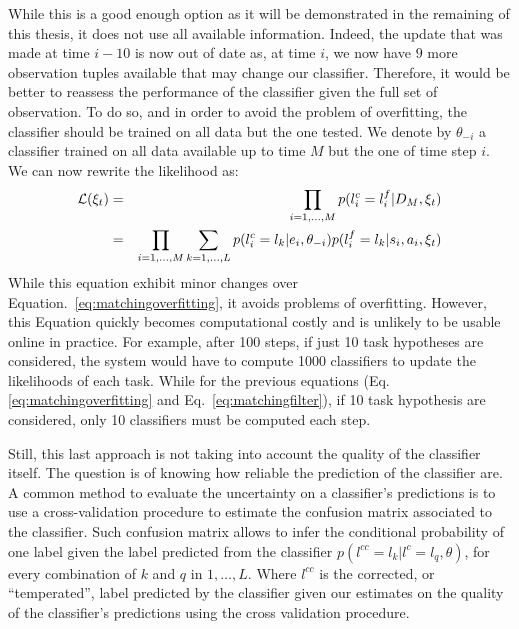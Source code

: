While this is a good enough option as it will be demonstrated in the remaining of this thesis, it does not use all available information. Indeed, the update that was made at time $i-10$ is now out of date as, at time $i$, we now have $9$ more observation tuples available that may change our classifier. Therefore, it would be better to reassess the performance of the classifier given the full set of observation. To do so, and in order to avoid the problem of overfitting, the classifier should be trained on all data but the one tested. We denote by $\theta_{-i}$ a classifier trained on all data available up to time $M$ but the one of time step $i$. We can now rewrite the likelihood as:
%
\begin{eqnarray}
\mathcal{L}(\xi_t) &=& \prod_{i = 1,\ldots,M} p(l^c_i = l^f_i | D_M, \xi_t) \nonumber \\ 
&=& \prod_{i = 1,\ldots,M} \sum_{k = 1, \ldots, L} p(l^c_i = l_k | e_i, \theta_{-i}) p(l^f_i = l_k | s_i, a_i, \xi_t) 
\label{eq:matching} 
\end{eqnarray}
%
While this equation exhibit minor changes over Equation.~\ref{eq:matchingoverfitting}, it avoids problems of overfitting. However, this Equation quickly becomes computational costly and is unlikely to be usable online in practice. For example, after 100 steps, if just 10 task hypotheses are considered, the system would have to compute 1000 classifiers to update the likelihoods of each task. While for the previous equations (Eq.\ref{eq:matchingoverfitting} and Eq.~\ref{eq:matchingfilter}), if 10 task hypothesis are considered, only 10 classifiers must be computed each step.

Still, this last approach is not taking into account the quality of the classifier itself. The question is of knowing how reliable the prediction of the classifier are. A common method to evaluate the uncertainty on a classifier's predictions is to use a cross-validation procedure to estimate the confusion matrix associated to the classifier. Such confusion matrix allows to infer the conditional probability of one label given the label predicted from the classifier $p(l^{cc} = l_k| l^c = l_q, \theta)$, for every combination of $k$ and $q$ in $1, \ldots, L$. Where $l^{cc}$ is the corrected, or ``temperated'', label predicted by the classifier given our estimates on the quality of the classifier's predictions using the cross validation procedure.

